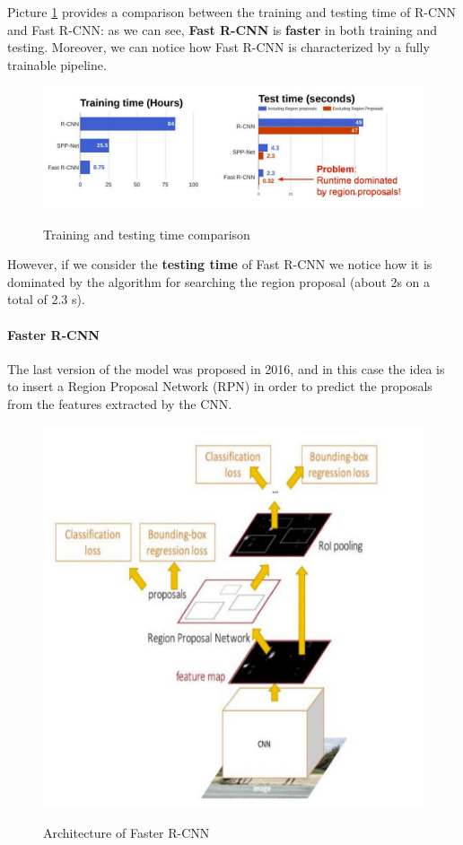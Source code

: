 Picture \ref{r-cnn vs fast r-cnn} provides a comparison between the training and testing time of R-CNN and Fast R-CNN: as we can see, \textbf{Fast R-CNN} is \textbf{faster} in both training and testing. Moreover, we can notice how Fast R-CNN is characterized by a fully trainable pipeline.

\begin{figure}[h!]
		\centering
        \includegraphics[scale = 0.70]{img/r-cnn vs fast r-cnn.jpg}
		\label{r-cnn vs fast r-cnn}
        \caption{Training and testing time comparison}
\end{figure}

However, if we consider the \textbf{testing time} of Fast R-CNN we notice how it is dominated by the algorithm for searching the region proposal (about 2s on a total of 2.3 s).

\paragraph{Faster R-CNN}
The last version of the model was proposed in 2016, and in this case the idea is to insert a Region Proposal Network (RPN) in order to predict the proposals from the features extracted by the CNN.

\begin{figure}[h!]
		\centering
        \includegraphics[scale = 0.70]{img/faster r-cnn.jpg}
		\label{faster r-cnn}
        \caption{Architecture of Faster R-CNN}
\end{figure}

